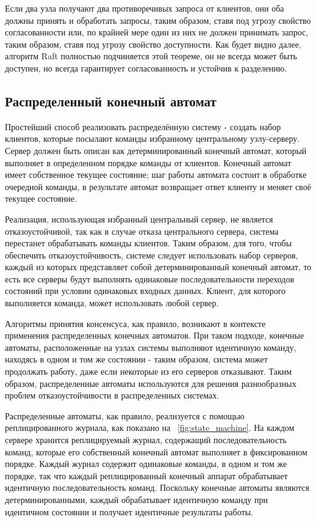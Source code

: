 \documentclass[subf, href, colorlinks=true, 14pt,
times, mtpro, specialist]{disser}
\newcommand{\figref}[1]{\figurename~\ref{#1}}
\theoremstyle{definition}
\begin{document}
Если два узла получают два противоречивых запроса от клиентов, они оба должны принять и обработать запросы, таким образом, ставя под угрозу свойство согласованности или, по крайней мере один из них не должен принимать запрос, таким образом, ставя под угрозу свойство доступности. Как будет видно далее, алгоритм Raft полностью подчиняется этой теореме, он не всегда может быть доступен, но всегда гарантирует согласованность и устойчив к разделению.

\subsection{Распределенный конечный автомат}

Простейший способ реализовать распределённую систему - создать набор клиентов, которые посылают команды избранному центральному узлу-серверу. Сервер должен быть описан как детерминированный конечный автомат, который выполняет в определенном порядке команды от клиентов. Конечный автомат имеет собственное текущее состояние; шаг работы автомата состоит в обработке очередной команды, в результате автомат возвращает ответ клиенту и меняет своё текущее состояние.

Реализация, использующая избранный центральный сервер, не является отказоустойчивой, так как в случае отказа центрального сервера, система перестанет обрабатывать команды клиентов. Таким образом, для
того, чтобы обеспечить отказоустойчивость, системе следует использовать набор серверов, каждый из которых представляет собой детерминированный конечный автомат, то есть все серверы будут выполнять одинаковые последовательности переходов состояний при условии одинаковых входных данных. Клиент, для которого выполняется команда, может использовать любой сервер.

Алгоритмы принятия консенсуса, как правило, возникают в контексте применения распределенных конечных автоматов. При таком подходе, конечные автоматы, расположенные на узлах системы выполняют идентичную команду, находясь в одном и том же состоянии - таким образом, система может продолжать работу, даже если некоторые из его серверов отказывают. Таким образом, распределенные автоматы используются для решения разнообразных проблем отказоустойчивости в распределенных системах.

Распределенные автоматы, как правило, реализуется с помощью реплицированного журнала, как показано на \figref{fig:state_machine}. На каждом сервере хранится реплицируемый журнал, содержащий последовательность команд, которые его собственный конечный автомат выполняет в фиксированном порядке. Каждый журнал содержит одинаковые команды, в одном и том же порядке, так что каждый реплицированный конечный аппарат обрабатывает идентичную последовательность команд. Поскольку конечные автоматы являются детерминированными, каждый обрабатывает идентичную команду при идентичном состоянии и получает идентичные результаты работы.
\end{document}
